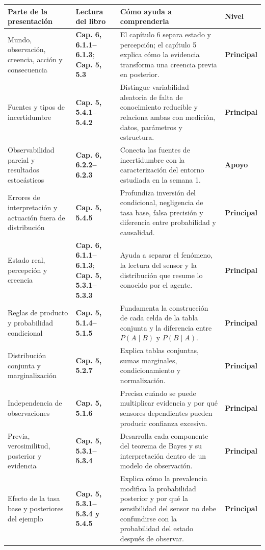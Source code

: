 \documentclass[10pt,a4paper]{article}
\newcommand{\capitulo}[1]{\textbf{\color{UAPTeal}#1}}
\newcommand{\principal}{\textbf{Principal}}
\newcommand{\apoyo}{\textbf{Apoyo}}
\newcommand{\encabezadotabla}{%
  \rowcolor{UAPNavy}
  \color{white}\textbf{Parte de la presentación} &
  \color{white}\textbf{Lectura del libro} &
  \color{white}\textbf{Cómo ayuda a comprenderla} &
  \color{white}\textbf{Nivel} \\
  \endhead
}
\begin{document}
\begin{longtable}{P{3.35cm}P{4.05cm}P{6.25cm}P{2.15cm}}
\toprule
\encabezadotabla
\midrule
Mundo, observación, creencia, acción y consecuencia & \capitulo{Cap. 6, 6.1.1--6.1.3}; \capitulo{Cap. 5, 5.3} & El capítulo 6 separa estado y percepción; el capítulo 5 explica cómo la evidencia transforma una creencia previa en posterior. & \principal \\
Fuentes y tipos de incertidumbre & \capitulo{Cap. 5, 5.4.1--5.4.2} & Distingue variabilidad aleatoria de falta de conocimiento reducible y relaciona ambas con medición, datos, parámetros y estructura. & \principal \\
Observabilidad parcial y resultados estocásticos & \capitulo{Cap. 6, 6.2.2--6.2.3} & Conecta las fuentes de incertidumbre con la caracterización del entorno estudiada en la semana 1. & \apoyo \\
Errores de interpretación y actuación fuera de distribución & \capitulo{Cap. 5, 5.4.5} & Profundiza inversión del condicional, negligencia de tasa base, falsa precisión y diferencia entre probabilidad y causalidad. & \principal \\
Estado real, percepción y creencia & \capitulo{Cap. 6, 6.1.1--6.1.3}; \capitulo{Cap. 5, 5.3.1--5.3.3} & Ayuda a separar el fenómeno, la lectura del sensor y la distribución que resume lo conocido por el agente. & \principal \\
Reglas de producto y probabilidad condicional & \capitulo{Cap. 5, 5.1.4--5.1.5} & Fundamenta la construcción de cada celda de la tabla conjunta y la diferencia entre $P(A\mid B)$ y $P(B\mid A)$. & \principal \\
Distribución conjunta y marginalización & \capitulo{Cap. 5, 5.2.7} & Explica tablas conjuntas, sumas marginales, condicionamiento y normalización. & \principal \\
Independencia de observaciones & \capitulo{Cap. 5, 5.1.6} & Precisa cuándo se puede multiplicar evidencia y por qué sensores dependientes pueden producir confianza excesiva. & \principal \\
Previa, verosimilitud, posterior y evidencia & \capitulo{Cap. 5, 5.3.1--5.3.4} & Desarrolla cada componente del teorema de Bayes y su interpretación dentro de un modelo de observación. & \principal \\
Efecto de la tasa base y posteriores del ejemplo & \capitulo{Cap. 5, 5.3.1--5.3.4 y 5.4.5} & Explica cómo la prevalencia modifica la probabilidad posterior y por qué la sensibilidad del sensor no debe confundirse con la probabilidad del estado después de observar. & \principal \\

\end{longtable}
\end{document}
